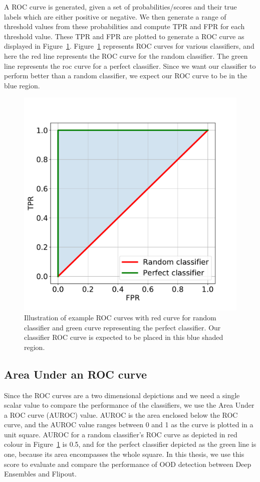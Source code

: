 A ROC curve is generated, given a set of probabilities/scores and their true labels which are either positive or negative.
We then generate a range of threshold values from these probabilities and compute TPR and FPR for each threshold value.
These TPR and FPR are plotted to generate a ROC curve as displayed in Figure~\ref{fig:ROC_curve_example}. 
Figure~\ref{fig:ROC_curve_example} represents ROC curves for various classifiers, and here the red line represents the ROC curve for the random classifier. The green line represents the roc curve for a perfect classifier.
Since we want our classifier to perform better than a random classifier, we expect our ROC curve to be in the blue region.
\begin{figure}[!ht]
    \centering
    \includegraphics[scale=0.35]{images/ROC_curve_example.pdf}
    \caption{Illustration of example ROC curves with red curve for random classifier and green curve representing the perfect classifier.
    Our classifier ROC curve is expected to be placed in this blue shaded region.}
    \label{fig:ROC_curve_example}
\end{figure}

\subsection{Area Under an ROC curve}
Since the ROC curves are a two dimensional depictions and we need a single scalar value to compare the performance of the classifiers, we use the Area Under a ROC curve (AUROC) value.
AUROC is the area enclosed below the ROC curve, and the AUROC value ranges between 0 and 1 as the curve is plotted in a unit square.
AUROC for a random classifier's ROC curve as depicted in red colour in Figure~\ref{fig:ROC_curve_example} is 0.5, and for the perfect classifier depicted as the green line is one, because its area encompasses the whole square.
In this thesis, we use this score to evaluate and compare the performance of OOD detection between Deep Ensembles and Flipout.

